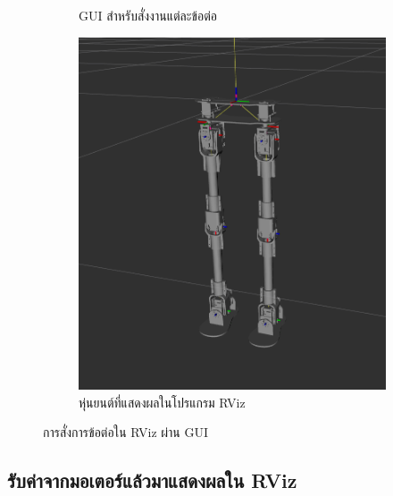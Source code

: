 \begin{figure}[!ht]
\begin{subfigure}[b]{0.29\textwidth}
        \caption{GUI สำหรับสั่งงานแต่ละข้อต่อ}
    \end{subfigure}
    \hfill
    \begin{subfigure}[b]{0.65\textwidth}
        \centering
        \includegraphics[width=\textwidth]{chapter4/images/uthai_rviz_model.png}
        \caption{หุ่นยนต์ที่แสดงผลในโปรแกรม RViz}
    \end{subfigure}
    \caption{การสั่งการข้อต่อใน RViz ผ่าน GUI}
\end{figure}




\clearpage
\subsection{รับค่าจากมอเตอร์แล้วมาแสดงผลใน RViz}

